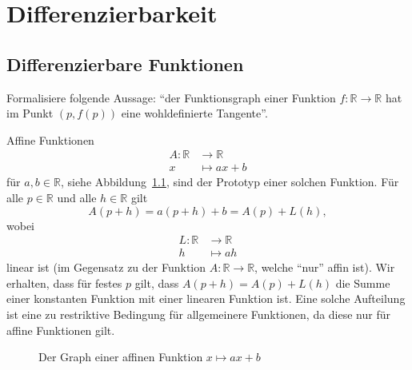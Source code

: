 \documentclass[../main.tex]{subfiles}
\begin{document}
\chapter{Differenzierbarkeit}
\section{Differenzierbare Funktionen}
\begin{goal}
  Formalisiere
  folgende Aussage:
  ``der Funktionsgraph einer Funktion
  $f \colon \mathbb{R} \to \mathbb{R}$
  hat im Punkt $(p, f(p))$ eine 
  wohldefinierte Tangente''.
\end{goal}

Affine Funktionen 
\begin{align*}
  A \colon \mathbb{R} & \to \mathbb{R} \\
  x & \mapsto ax + b
\end{align*}
für $a, b \in \mathbb{R}$,
siehe Abbildung~\ref{fig:affin},
sind der Prototyp
einer solchen Funktion.
Für alle $p \in \mathbb{R}$ und
alle $h \in \mathbb{R}$ gilt
\[
  A(p+h) = a(p+ h) + b = A(p) + L(h),
\]
wobei
\begin{align*}
  L \colon \mathbb{R} & \to \mathbb{R} \\
  h & \mapsto ah
\end{align*}
linear ist (im Gegensatz
zu der Funktion
$A \colon \mathbb{R} \to \mathbb{R}$,
welche ``nur'' affin ist).
Wir erhalten, dass für festes $p$ 
gilt, dass
  $A(p+h) = A(p) + L(h)$
die Summe einer konstanten
Funktion mit einer linearen Funktion ist.
Eine solche Aufteilung ist
eine zu restriktive Bedingung
für allgemeinere Funktionen,
da diese nur für affine Funktionen
gilt.


\begin{figure}[htb]
  \centering
  
  \caption{Der
  Graph einer affinen Funktion
$x \mapsto ax + b$}
  \label{fig:affin}
\end{figure}
\end{document}
